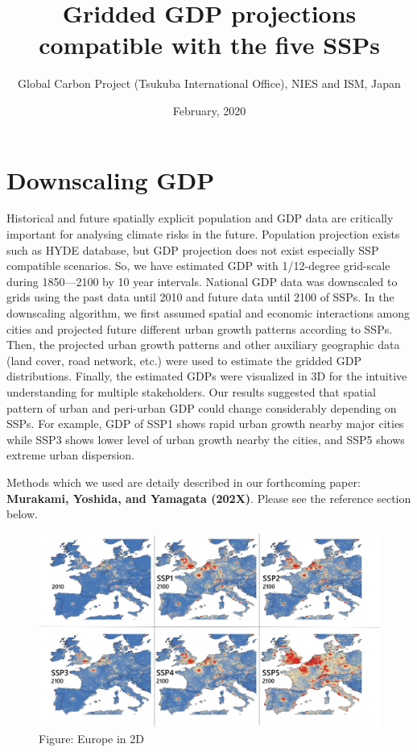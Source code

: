 \documentclass[]{book}
\title{Gridded GDP projections compatible with the five SSPs}
\author{Global Carbon Project (Tsukuba International Office), NIES and ISM, Japan}
\date{February, 2020}
\begin{document}
\maketitle

{
\setcounter{tocdepth}{1}
\tableofcontents
}
\hypertarget{downscaling-gdp}{%
\chapter*{Downscaling GDP}\label{downscaling-gdp}}

Historical and future spatially explicit population and GDP data are critically important for analysing climate risks in the future. Population projection exists such as HYDE database, but GDP projection does not exist especially SSP compatible scenarios. So, we have estimated GDP with 1/12-degree grid-scale during 1850---2100 by 10 year intervals. National GDP data was downscaled to grids using the past data until 2010 and future data until 2100 of SSPs. In the downscaling algorithm, we first assumed spatial and economic interactions among cities and projected future different urban growth patterns according to SSPs. Then, the projected urban growth patterns and other auxiliary geographic data (land cover, road network, etc.) were used to estimate the gridded GDP distributions. Finally, the estimated GDPs were visualized in 3D for the intuitive understanding for multiple stakeholders. Our results suggested that spatial pattern of urban and peri-urban GDP could change considerably depending on SSPs. For example, GDP of SSP1 shows rapid urban growth nearby major cities while SSP3 shows lower level of urban growth nearby the cities, and SSP5 shows extreme urban dispersion.

Methods which we used are detaily described in our forthcoming paper:
\textbf{Murakami, Yoshida, and Yamagata (202X)}. Please see the reference section below.

\begin{figure}
\centering
\includegraphics{Europe.png}
\caption{Figure: Europe in 2D}
\end{figure}
\end{document}
